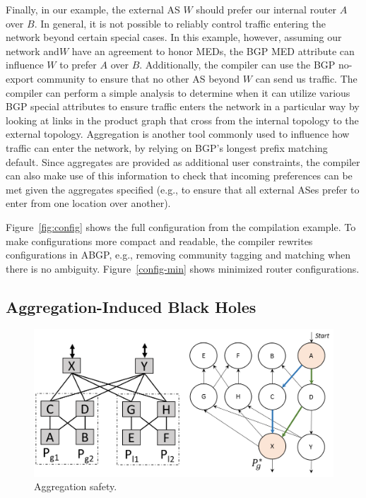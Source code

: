 Finally, in our example, the external AS $W$ should prefer our internal router $A$ over $B$. In general, it is not possible to reliably control traffic entering the network beyond certain special cases. In this example, however, assuming our network and$W$ have an agreement to honor MEDs, the BGP MED attribute can influence $W$ to prefer $A$ over $B$. Additionally, the compiler can use the BGP no-export community to ensure that no other AS beyond $W$ can send us traffic. The compiler can perform a simple analysis to determine when it can utilize various BGP special attributes to ensure traffic enters the network in a particular way by looking at links in the product graph that cross from the internal topology to the external topology. Aggregation is another tool commonly used to influence how traffic can enter the network, by relying on BGP's longest prefix matching default. Since aggregates are provided as additional user constraints, the compiler can also make use of this information to check that incoming preferences can be met given the aggregates specified (e.g., to ensure that all external ASes prefer to enter from one location over another).

Figure~\ref{fig:config} shows the full configuration from the compilation example. To make configurations more compact and readable, the \sysname compiler rewrites configurations in ABGP, e.g., removing community tagging and matching when there is no ambiguity. Figure~\ref{config-min} shows minimized router configurations. 



\subsection{Aggregation-Induced Black Holes}

\begin{figure}[t!]
\centering
\includegraphics[width=\columnwidth]{figures/aggregation}
\caption{Aggregation safety.}
\label{fig:aggregation-safety}
\end{figure}


